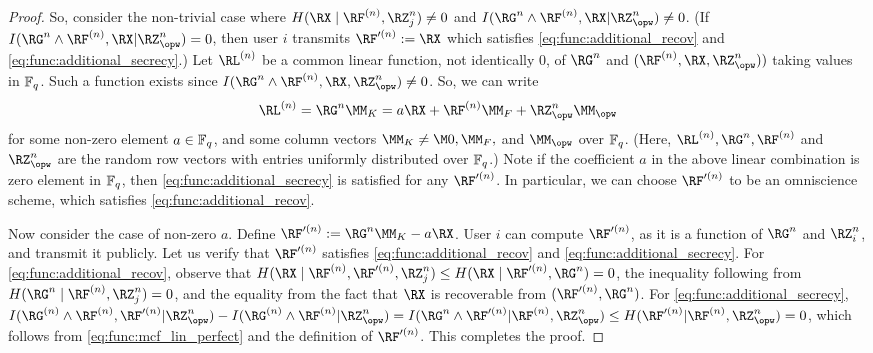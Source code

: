 {\begin{proof}
So, consider the non-trivial case where $H(\RX\mid \RF^{(n)}, \RZ_j^n) \neq 0$ and $I(\RG^n \wedge \RF^{(n)}, \RX| \RZ_{\opw}^n) \neq 0$. (If $I(\RG^n \wedge \RF^{(n)}, \RX| \RZ_{\opw}^n)=0$, then user $i$ transmits $\RF'^{(n)}:= \RX$ which satisfies \eqref{eq:func:additional_recov} and \eqref{eq:func:additional_secrecy}.)
Let $\RL^{(n)}$ be a common linear function, not identically $0$, of $\RG^n$ and $(\RF^{(n)}, \RX, \RZ_{\opw}^n))$ taking values in $\mathbb{F}_q$. Such a function exists since $I(\RG^n \wedge \RF^{(n)}, \RX, \RZ_{\opw}^n) \neq 0$. So, we can write \begin{align}
    \RL^{(n)}=\RG^n\MM_K= a\RX + \RF^{(n)}\MM_{F}+\RZ_{\opw}^n \MM_{\opw} \label{eq:func:mcf_lin_perfect}
\end{align}
for some non-zero element $a \in \mathbb{F}_q$, and some  column vectors $\MM_K \neq \M0, \MM_{F},$ and $\MM_{\opw}$ over $\mathbb{F}_q$. (Here, $\RL^{(n)},\RG^n,\RF^{(n)}$ and $\RZ_{\opw}^n$ are the random row vectors with entries uniformly distributed over $\mathbb{F}_q$.) Note if the coefficient $a$ in the above linear combination is zero element in $\mathbb{F}_q$, then \eqref{eq:func:additional_secrecy} is satisfied for any $\RF'^{(n)}$. In particular, we can choose $\RF'^{(n)}$ to be an omniscience scheme, which satisfies \eqref{eq:func:additional_recov}.

Now consider the case of non-zero $a$. Define $\RF'^{(n)}:= \RG^n\MM_K - a\RX$. User $i$ can compute $\RF'^{(n)}$, as it is a function of  $\RG^n$ and $\RZ_i^n$, and transmit it publicly. Let us verify that $\RF'^{(n)}$ satisfies \eqref{eq:func:additional_recov} and \eqref{eq:func:additional_secrecy}. For \eqref{eq:func:additional_recov}, observe that  $H(\RX\mid \RF^{(n)},\RF'^{(n)}, \RZ_j^n) \leq H(\RX\mid \RF'^{(n)}, \RG^n)=0$, the inequality following from $H(\RG^n\mid\RF^{(n)},\RZ_j^n)=0$, and the  equality from the fact that $\RX$ is recoverable from $(\RF'^{(n)}, \RG^n)$. For \eqref{eq:func:additional_secrecy}, $I(\RG^{(n)} \wedge \RF^{(n)},\RF'^{(n)}| \RZ_{\opw}^n) - I(\RG^{(n)} \wedge \RF^{(n)}| \RZ_{\opw}^n)=I(\RG^n\wedge \RF'^{(n)}|\RF^{(n)}, \RZ_{\opw}^n)\leq H(\RF'^{(n)}|\RF^{(n)}, \RZ_{\opw}^n) = 0$,  which follows from \eqref{eq:func:mcf_lin_perfect} and the definition of $\RF'^{(n)}$. This completes the proof.
\end{proof}


}
